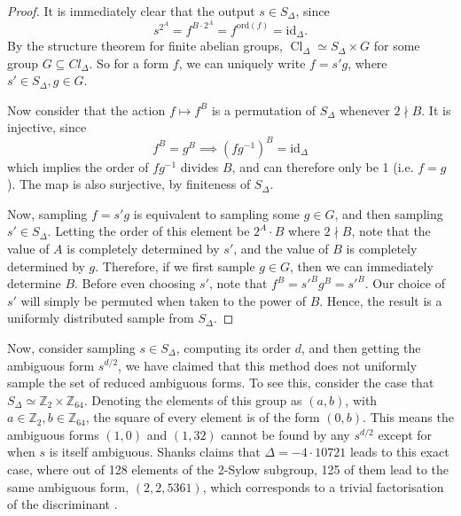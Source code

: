 \documentclass[honours,12pt]{unswthesis}
\newcommand{\Z}{\mathbb{Z}} %
\DeclareMathOperator{\Cl}{Cl}
\numberwithin{equation}{section}
\begin{document}
\begin{proof}
    It is immediately clear that the output $s \in S_\Delta$, since 
    $$s^{2^A} = f^{B \cdot 2^A} = f^{\text{ord}(f)} = \text{id}_\Delta.$$
    By the structure theorem for finite abelian groups, $\Cl_\Delta \simeq S_\Delta \times G$ for some group $G \subseteq Cl_\Delta$.
    So for a form $f$, we can uniquely write $f = s'g$, where $s' \in S_\Delta, g \in G$.

    Now consider that the action $f \mapsto f^B$ is a permutation of $S_\Delta$ whenever $2 \nmid B$.
    It is injective, since 
    $$f^B = g^B \implies (fg^{-1})^B = \text{id}_\Delta$$
    which implies the order of $fg^{-1}$ divides $B$, and can therefore only be 1 (i.e. $f = g$).
    The map is also surjective, by finiteness of $S_\Delta$.

    Now, sampling $f = s'g$ is equivalent to sampling some $g \in G$, and then sampling $s' \in S_\Delta$.
    Letting the order of this element be $2^A \cdot B$ where $2 \nmid B$, note that the value of $A$ is completely determined by $s'$, and the value of $B$ is completely determined by $g$.
    Therefore, if we first sample $g \in G$, then we can immediately determine $B$.
    Before even choosing $s'$, note that
    $f^B = s'^B g^B = s'^B.$
    Our choice of $s'$ will simply be permuted when taken to the power of $B$.
    Hence, the result is a uniformly distributed sample from $S_\Delta$.
\end{proof}

Now, consider sampling $s \in S_\Delta$, computing its order $d$, and then getting the ambiguous form $s^{d/2}$, we have claimed that this method does not uniformly sample the set of reduced ambiguous forms.
To see this, consider the case that $S_\Delta \simeq \Z_2 \times \Z_{64}$.
Denoting the elements of this group as $(a, b)$, with $a \in \Z_2, b \in \Z_{64}$, the square of every element is of the form $(0, b)$.
This means the ambiguous forms $(1, 0)$ and $(1, 32)$ cannot be found by any $s^{d/2}$ except for when $s$ is itself ambiguous.
Shanks claims that $\Delta = -4 \cdot 10721$ leads to this exact case, where out of 128 elements of the 2-Sylow subgroup, 125 of them lead to the same ambiguous form, $(2, 2, 5361)$, which corresponds to a trivial factorisation of the discriminant \cite[\S\,7]{shanks}.
\end{document}
